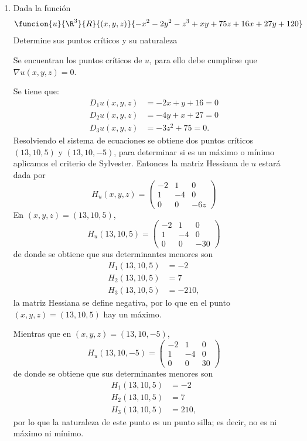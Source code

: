 \documentclass[a4,11pt]{aleph-examen}
\begin{document}
\begin{preguntas}
\begin{respuesta}
\begin{respuesta}
\begin{respuesta}
\begin{enumerate}
\item 
    Dada la función
    \[
    \funcion{u}{\R^3}{R}{(x,y,z)}{-x^2-2y^2-z^3+xy+75z+16x+27y+120}
    \]
    Determine sus puntos críticos y su naturaleza
\begin{respuesta}
    Se encuentran los puntos críticos de $u$, para ello debe cumplirse que $\nabla u (x,y,z)=0$. 

    Se tiene que:
        \[
        \begin{aligned}
        D_1u(x,y,z)&=-2x+y+16=0\\
        D_2u(x,y,z)&=-4y+x+27=0\\
        D_3u(x,y,z)&=-3z^2+75=0.
        \end{aligned}
        \]
    Resolviendo el sistema de ecuaciones se obtiene dos puntos críticos $(13,10,5)$ y $(13,10,-5)$, para determinar si es un máximo o mínimo aplicamos el criterio de Sylvester.
    Entonces la matriz Hessiana de $u$ estará dada por
    \[
        H_u(x,y,z)= \begin{pmatrix}
        -2 & 1 & 0\\
        1 & -4 & 0\\
        0 & 0 & -6z
        \end{pmatrix}
    \]
    En $(x,y,z)=(13,10,5)$,
    \[
        H_u(13,10,5)= \begin{pmatrix}
        -2 & 1 & 0\\
        1 & -4 & 0\\
        0 & 0 & -30
        \end{pmatrix}
    \]
    de donde se obtiene que sus determinantes menores son
    \[
        \begin{aligned}
        H_1(13,10,5)&=-2\\
        H_2(13,10,5)&=7\\
        H_3(13,10,5)&=-210,
        \end{aligned}
    \]
    la matriz Hessiana se define negativa, por lo que en el punto $(x,y,z)=(13,10,5)$ hay un máximo.

    Mientras que en $(x,y,z)=(13,10,-5)$,
    \[
    H_u(13,10,-5)= \begin{pmatrix}
        -2 & 1 & 0\\
        1 & -4 & 0\\
        0 & 0 & 30
        \end{pmatrix}
    \]
     de donde se obtiene que sus determinantes menores son
    \[
        \begin{aligned}
        H_1(13,10,5)&=-2\\
        H_2(13,10,5)&=7\\
        H_3(13,10,5)&=210,
        \end{aligned}
    \]
    por lo que la naturaleza de este punto es un punto silla; es decir, no es ni máximo ni mínimo.
\end{respuesta}


\end{enumerate}
\end{respuesta}
\end{respuesta}
\end{respuesta}
\end{preguntas}
\end{document}
